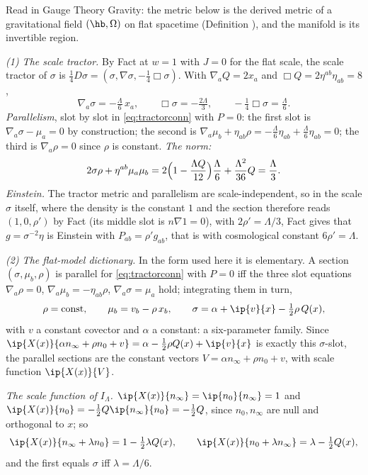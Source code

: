 Read in Gauge Theory Gravity: the metric below is the derived metric of a gravitational field $(\hb, \Omega)$ on flat spacetime (Definition ), and the manifold is its invertible region.

\emph{(1) The scale tractor.} By Fact  at $w = 1$ with $J = 0$ for the flat scale, the scale tractor of $\sigma$ is $\tfrac14 D\sigma = (\sigma, \nabla\sigma, -\tfrac14\Box\sigma)$. With $\nabla_{a}Q = 2x_{a}$ and $\Box Q = 2\eta^{ab}\eta_{ab} = 8$,
\[
\nabla_{a}\sigma = -\tfrac{\Lambda}{6}\,x_{a}, \qquad \Box\sigma = -\tfrac{2\Lambda}{3}, \qquad -\tfrac14\Box\sigma = \tfrac{\Lambda}{6}.
\]
\emph{Parallelism}, slot by slot in \eqref{eq:tractorconn} with $P = 0$: the first slot is $\nabla_{a}\sigma - \mu_{a} = 0$ by construction; the second is $\nabla_{a}\mu_{b} + \eta_{ab}\rho = -\tfrac{\Lambda}{6}\eta_{ab} + \tfrac{\Lambda}{6}\eta_{ab} = 0$; the third is $\nabla_{a}\rho = 0$ since $\rho$ is constant. \emph{The norm:}
\[
2\sigma\rho + \eta^{ab}\mu_{a}\mu_{b} = 2\Bigl(1 - \frac{\Lambda Q}{12}\Bigr)\frac{\Lambda}{6} + \frac{\Lambda^{2}}{36}Q = \frac{\Lambda}{3}.
\]
\emph{Einstein.} The tractor metric and parallelism are scale-independent, so in the scale $\sigma$ itself, where the density is the constant $1$ and the section therefore reads $(1, 0, \rho')$ by Fact  (its middle slot is $n\nabla 1 = 0$), with $2\rho' = \Lambda/3$, Fact  gives that $g = \sigma^{-2}\eta$ is Einstein with $P_{ab} = \rho' g_{ab}$, that is with cosmological constant $6\rho' = \Lambda$.

\emph{(2) The flat-model dictionary.} In the form used here it is elementary. A section $(\sigma, \mu_{b}, \rho)$ is parallel for \eqref{eq:tractorconn} with $P = 0$ iff the three slot equations $\nabla_{a}\rho = 0$, $\nabla_{a}\mu_{b} = -\eta_{ab}\rho$, $\nabla_{a}\sigma = \mu_{a}$ hold; integrating them in turn,
\[
\rho = \text{const}, \qquad \mu_{b} = v_{b} - \rho\, x_{b}, \qquad \sigma = \alpha + \ip{v}{x} - \tfrac12\rho\, Q(x),
\]
with $v$ a constant covector and $\alpha$ a constant: a six-parameter family. Since $\ip{X(x)}{\alpha n_{\infty} + \rho n_{0} + v} = \alpha - \tfrac12\rho Q(x) + \ip{v}{x}$ is exactly this $\sigma$-slot, the parallel sections are the constant vectors $V = \alpha n_{\infty} + \rho n_{0} + v$, with scale function $\ip{X(x)}{V}$.

\emph{The scale function of $I_{\Lambda}$.} $\ip{X(x)}{n_{\infty}} = \ip{n_{0}}{n_{\infty}} = 1$ and $\ip{X(x)}{n_{0}} = -\tfrac12 Q\ip{n_{\infty}}{n_{0}} = -\tfrac12 Q$, since $n_{0}, n_{\infty}$ are null and orthogonal to $x$; so
\[
\ip{X(x)}{n_{\infty} + \lambda n_{0}} = 1 - \tfrac12\lambda Q(x), \qquad \ip{X(x)}{n_{0} + \lambda n_{\infty}} = \lambda - \tfrac12 Q(x),
\]
and the first equals $\sigma$ iff $\lambda = \Lambda/6$.

